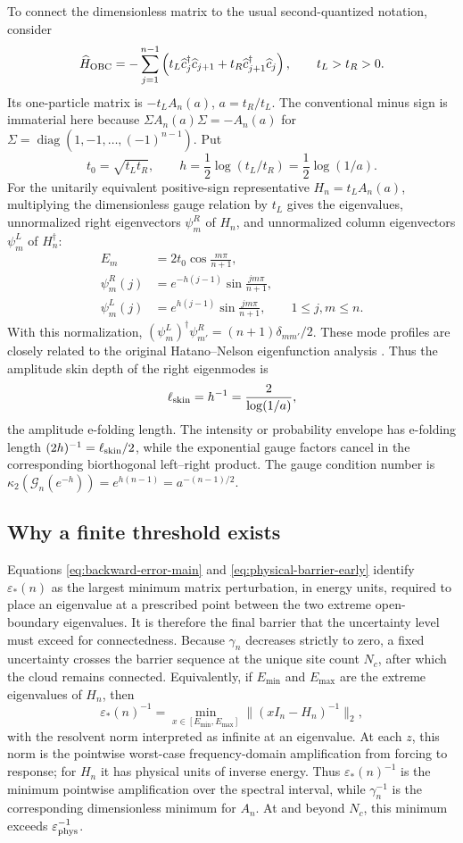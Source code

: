 \documentclass[12pt,anonymous]{iopjournal}
\numberwithin{equation}{section}
\theoremstyle{remark}
\DeclareMathOperator{\diag}{diag}
\begin{document}
To connect the dimensionless matrix to the usual second-quantized
notation, consider
\[
 \widehat H_{\rm OBC}=-\sum_{j=1}^{n-1}
 \left(t_L\widehat c_j^\dagger\widehat c_{j+1}
 +t_R\widehat c_{j+1}^\dagger\widehat c_j\right),
 \qquad t_L>t_R>0.
\]
Its one-particle matrix is \(-t_LA_n(a)\), \(a=t_R/t_L\).  The
conventional minus sign is immaterial here because
\(\Sigma A_n(a)\Sigma=-A_n(a)\) for
\(\Sigma=\diag(1,-1,\ldots,(-1)^{n-1})\).  Put
\[
 t_0=\sqrt{t_Lt_R},\qquad
 h=\frac12\log(t_L/t_R)
 =\frac12\log(1/a).
\]
For the unitarily equivalent positive-sign representative
\(H_n=t_LA_n(a)\), multiplying the dimensionless gauge relation by \(t_L\)
gives the eigenvalues, unnormalized right eigenvectors \(\psi_m^R\) of
\(H_n\), and unnormalized column eigenvectors \(\psi_m^L\) of
\(H_n^\dagger\):
\begin{align*}
 E_m&=2t_0\cos\frac{m\pi}{n+1},\\
 \psi_m^R(j)&=e^{-h(j-1)}\sin\frac{jm\pi}{n+1},\\
 \psi_m^L(j)&=e^{h(j-1)}\sin\frac{jm\pi}{n+1},
 \qquad 1\leq j,m\leq n.
\end{align*}
With this normalization,
\((\psi_m^L)^\dagger\psi_{m'}^R=(n+1)\delta_{mm'}/2\).
These mode profiles are closely related to the original Hatano--Nelson
eigenfunction analysis \cite{HatanoNelson1998}.
Thus the amplitude skin depth of the right eigenmodes is
\[
 \ell_{\rm skin}=h^{-1}=\frac{2}{\log(1/a)},
\]
the amplitude e-folding length.  The intensity or probability envelope has
e-folding length \((2h)^{-1}=\ell_{\rm skin}/2\), while the exponential gauge
factors cancel in the corresponding biorthogonal left--right product.  The
gauge condition number is
\(\kappa_2(\mathcal G_n(e^{-h}))
=e^{h(n-1)}=a^{-(n-1)/2}\).

\subsection{Why a finite threshold exists}

Equations \eqref{eq:backward-error-main} and
\eqref{eq:physical-barrier-early} identify \(\varepsilon_*(n)\) as the
largest minimum matrix perturbation, in energy units, required to place an
eigenvalue at a prescribed point between the two extreme open-boundary
eigenvalues.  It is therefore the final barrier that the uncertainty level
must exceed for connectedness.
Because \(\gamma_n\) decreases strictly to zero, a fixed uncertainty crosses
the barrier sequence at the unique site count \(N_c\), after which the cloud
remains connected.  Equivalently, if
\(E_{\min}\) and \(E_{\max}\) are the extreme eigenvalues of \(H_n\), then
\[
 \varepsilon_*(n)^{-1}
 =\min_{x\in[E_{\min},E_{\max}]}
 \lVert(xI_n-H_n)^{-1}\rVert_2,
\]
with the resolvent norm interpreted as infinite at an eigenvalue.  At each
\(z\), this norm is the pointwise worst-case frequency-domain amplification
from forcing to response; for \(H_n\) it has physical units of inverse
energy.  Thus \(\varepsilon_*(n)^{-1}\) is the minimum pointwise amplification
over the spectral interval, while \(\gamma_n^{-1}\) is the corresponding
dimensionless minimum for \(A_n\).  At and beyond \(N_c\), this minimum
exceeds \(\varepsilon_{\rm phys}^{-1}\).
\end{document}
